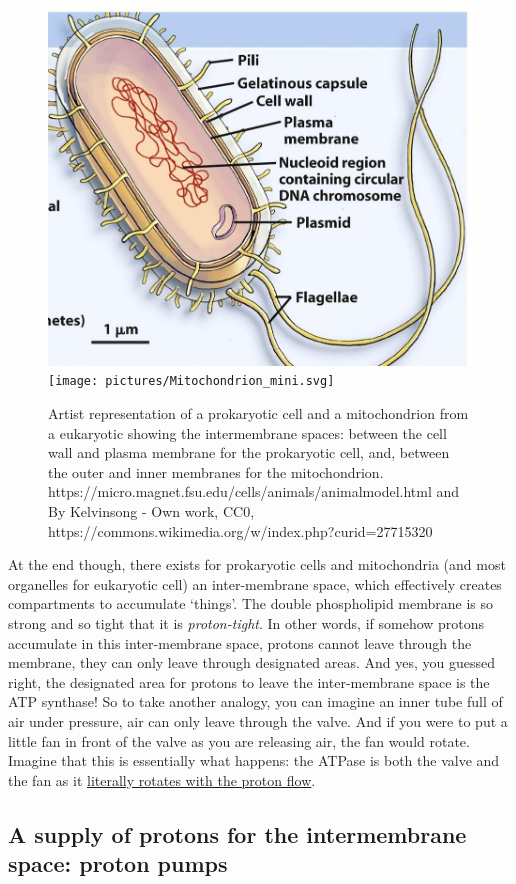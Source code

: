 \documentclass[]{book}
\theoremstyle{definition}
\theoremstyle{definition}
\theoremstyle{definition}
\theoremstyle{remark}
\begin{document}
\begin{figure}

{\centering \includegraphics[width=0.45\linewidth]{pictures/prokaryotic-cell-diagram} \texttt{[image: pictures/Mitochondrion\_mini.svg]} 

}

\caption{Artist representation of a prokaryotic cell and a mitochondrion from a eukaryotic showing the intermembrane spaces: between the cell wall and plasma membrane for the prokaryotic cell, and, between the outer and inner membranes for the mitochondrion.  https://micro.magnet.fsu.edu/cells/animals/animalmodel.html and By Kelvinsong - Own work, CC0, https://commons.wikimedia.org/w/index.php?curid=27715320}\label{fig:cells}
\end{figure}

At the end though, there exists for prokaryotic cells and mitochondria
(and most organelles for eukaryotic cell) an inter-membrane space, which
effectively creates compartments to accumulate `things'. The double
phospholipid membrane is so strong and so tight that it is
\emph{proton-tight}. In other words, if somehow protons accumulate in
this inter-membrane space, protons cannot leave through the membrane,
they can only leave through designated areas. And yes, you guessed
right, the designated area for protons to leave the inter-membrane space
is the ATP synthase! So to take another analogy, you can imagine an
inner tube full of air under pressure, air can only leave through the
valve. And if you were to put a little fan in front of the valve as you
are releasing air, the fan would rotate. Imagine that this is
essentially what happens: the ATPase is both the valve and the fan as it
\href{https://upload.wikimedia.org/wikipedia/commons/6/62/ATPsyn.gif}{literally
rotates with the proton flow}.

\subsection{A supply of protons for the intermembrane space: proton
pumps}\label{a-supply-of-protons-for-the-intermembrane-space-proton-pumps}
\end{document}
